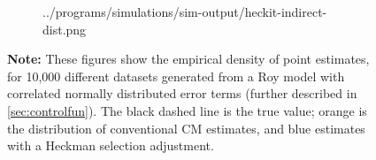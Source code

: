 \begin{figure}[h!]
\begin{subfigure}[c]{0.475\textwidth}
{            ../programs/simulations/sim-output/heckit-indirect-dist.png}
    \end{subfigure}
    \label{fig:cm-heckit-dist}
    \justify
    \footnotesize    
    \textbf{Note:}
    These figures show the empirical density of point estimates, for 10,000 different datasets generated from a Roy model with correlated normally distributed error terms (further described in \autoref{sec:controlfun}).
    The black dashed line is the true value;
    orange is the distribution of conventional CM estimates,
    and blue estimates with a Heckman selection adjustment.
\end{figure}
